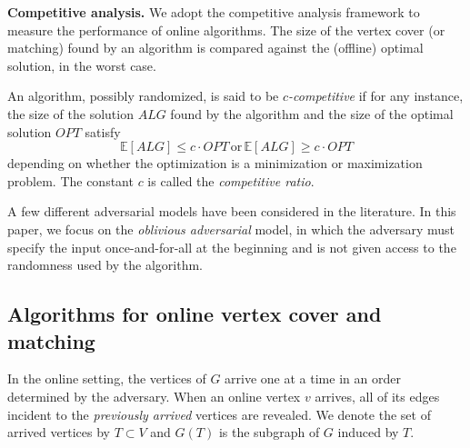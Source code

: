 \documentclass{article}
\begin{document}
{\bf Competitive analysis.}
We adopt the competitive analysis framework to measure the performance of online algorithms. The size of the vertex cover  (or matching) found by an algorithm is compared against the (offline) optimal solution, in the worst case.

An algorithm, possibly randomized, is said to be \textit{$c$-competitive} if for any instance, the size of the solution $ALG$ found by the algorithm and the size of the optimal solution $OPT$ satisfy 
\[
\mathbb{E}[ALG] \leq c\cdot OPT\,\mathrm{ or }\,\mathbb{E}[ALG]\geq  c\cdot OPT
\]
depending on whether the optimization is a minimization or maximization problem. The constant $c$ is called the \textit{competitive ratio}.

A few different adversarial models have been considered in the literature. In this paper, we focus on the {\em oblivious adversarial} model, in which the adversary must specify the input once-and-for-all at the beginning and is not given access to the randomness used by the algorithm. %

\subsection{Algorithms for online vertex cover and matching}
In the online setting, the vertices of $G$ arrive one at a time in an order determined by the adversary. When an online vertex $v$ arrives, all of its edges incident to the {\em previously arrived} vertices are revealed. We denote the set of arrived vertices by $T\subset V$ and $G(T)$ is the subgraph of $G$ induced by $T$.

\end{document}
